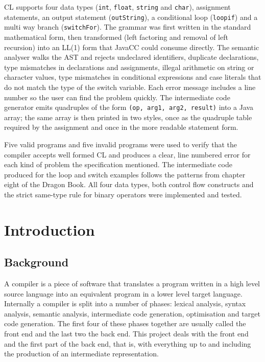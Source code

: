 \documentclass[12pt,a4paper]{report}
\begin{document}
CL supports four data types (\texttt{int}, \texttt{float}, \texttt{string} and \texttt{char}), assignment statements, an output statement (\texttt{outString}), a conditional loop (\texttt{loopif}) and a multi way branch (\texttt{switchFor}). The grammar was first written in the standard mathematical form, then transformed (left factoring and removal of left recursion) into an LL(1) form that JavaCC could consume directly. The semantic analyser walks the AST and rejects undeclared identifiers, duplicate declarations, type mismatches in declarations and assignments, illegal arithmetic on string or character values, type mismatches in conditional expressions and case literals that do not match the type of the switch variable. Each error message includes a line number so the user can find the problem quickly. The intermediate code generator emits quadruples of the form \texttt{(op, arg1, arg2, result)} into a Java array; the same array is then printed in two styles, once as the quadruple table required by the assignment and once in the more readable statement form.

Five valid programs and five invalid programs were used to verify that the compiler accepts well formed CL and produces a clear, line numbered error for each kind of problem the specification mentioned. The intermediate code produced for the loop and switch examples follows the patterns from chapter eight of the Dragon Book. All four data types, both control flow constructs and the strict same-type rule for binary operators were implemented and tested.

\newpage

\tableofcontents
\newpage
\listoffigures
\newpage
\listoftables
\newpage

\chapter{Introduction}

\section{Background}

A compiler is a piece of software that translates a program written in a high level source language into an equivalent program in a lower level target language. Internally a compiler is split into a number of phases: lexical analysis, syntax analysis, semantic analysis, intermediate code generation, optimisation and target code generation. The first four of these phases together are usually called the front end and the last two the back end. This project deals with the front end and the first part of the back end, that is, with everything up to and including the production of an intermediate representation.
\end{document}
